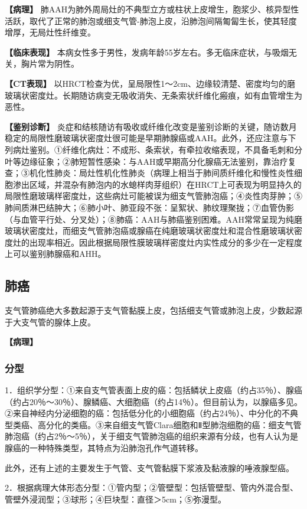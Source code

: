 \textbf{【病理】}
肺AAH为肺外周局灶的不典型立方或柱状上皮增生，胞浆少、核异型性活跃，取代了正常的肺泡或细支气管-肺泡上皮，沿肺泡间隔匍匐生长，使其轻度增厚，无局灶性纤维变。

\textbf{【临床表现】}
本病女性多于男性，发病年龄55岁左右。多无临床症状，与吸烟无关，胸片常为阴性。

\textbf{【CT表现】}
以HRCT检查为优，呈局限性1～2cm、边缘较清楚、密度均匀的磨玻璃状密度灶。长期随访病变无吸收消失、无条索状纤维化瘢痕，如有血管增生为恶性。

\textbf{【鉴别诊断】}
炎症和结核随访有吸收或纤维化改变是鉴别诊断的关键，随访数月稳定的局限性磨玻璃状密度灶很可能是早期肺腺癌或AAH。此外，还应注意与下列病灶鉴别。①纤维化病灶：不成形、条索状，有牵拉收缩表现，不具备毛刺和分叶等边缘征象；②肺短暂性感染：与AAH或早期高分化腺癌无法鉴别，靠治疗复查；③机化性肺炎：局灶性机化性肺炎（病理上相当于肺间质纤维化和慢性炎性细胞渗出区域，并混杂有肺泡内的水螅样肉芽组织）在HRCT上可表现为明显持久的局限性磨玻璃样密度灶，这些病灶可能被误为细支气管肺泡癌；④炎性肉芽肿；⑤肺间质淋巴结肿大；⑥肺小叶、肺亚段不张：呈絮状、肺纹理聚拢；⑦血管伪影（与血管平行处、分叉处）；⑧肺癌：AAH与肺癌鉴别困难。AAH常常呈现为纯磨玻璃状密度灶，而细支气管肺泡癌或腺癌在纯磨玻璃状密度灶和混合性磨玻璃状密度灶的出现率相近。因此根据局限性膜玻璃样密度灶内实性成分的多少在一定程度上可以鉴别肺腺癌和AHH。

\subsection{肺癌}

支气管肺癌绝大多数起源于支气管黏膜上皮，包括细支气管或肺泡上皮，少数起源于大支气管的腺体上皮。

\textbf{【病理】}

\subsubsection{分型}

1．组织学分型：①来自支气管表面上皮的癌：包括鳞状上皮癌（约占35％）、腺癌（约占20％～30％）、腺鳞癌、大细胞癌（约占14％）。但目前认为，以腺癌多见。②来自神经内分泌细胞的癌：包括低分化的小细胞癌（约占24％）、中分化的不典型类癌、高分化的类癌。③来自细支气管Clara细胞和Ⅱ型肺泡细胞的癌：细支气管肺泡癌（约占2％～5％），关于细支气管肺泡癌的组织来源有分歧，也有人认为是腺癌的一种特殊类型，其特点为沿肺泡孔作气道转移。

此外，还有上述的主要发生于气管、支气管黏膜下浆液及黏液腺的唾液腺型癌。

2．根据病理大体形态分型：①管内型；②管壁型：包括管壁型、管内外混合型、管壁外浸润型；③球形；④巨块型：直径＞5cm；⑤弥漫型。

